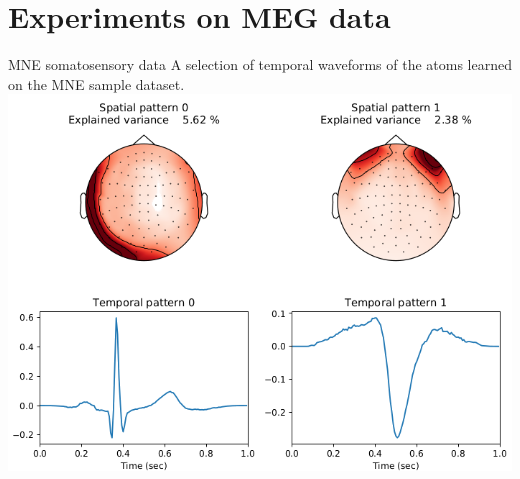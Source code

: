 \documentclass{beamer}
\begin{document}
\section{Experiments on MEG data}

\begin{frame}{MNE somatosensory data}
A selection of temporal waveforms of the atoms learned on the MNE sample dataset.\\[1em]
\centering
\includegraphics[height=0.7\textheight]{artifacts}
\end{frame}
\end{document}
